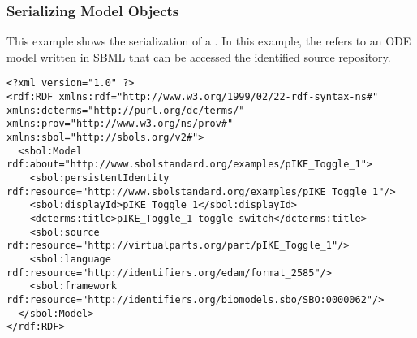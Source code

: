 \subsubsection{Serializing Model Objects}
This example shows the serialization of a . In this example, the  refers to an ODE model written in SBML that can be accessed the identified source repository.
\begin{lstlisting}
<?xml version="1.0" ?>
<rdf:RDF xmlns:rdf="http://www.w3.org/1999/02/22-rdf-syntax-ns#" xmlns:dcterms="http://purl.org/dc/terms/" xmlns:prov="http://www.w3.org/ns/prov#" xmlns:sbol="http://sbols.org/v2#">
  <sbol:Model rdf:about="http://www.sbolstandard.org/examples/pIKE_Toggle_1">
    <sbol:persistentIdentity rdf:resource="http://www.sbolstandard.org/examples/pIKE_Toggle_1"/>
    <sbol:displayId>pIKE_Toggle_1</sbol:displayId>
    <dcterms:title>pIKE_Toggle_1 toggle switch</dcterms:title>
    <sbol:source rdf:resource="http://virtualparts.org/part/pIKE_Toggle_1"/>
    <sbol:language rdf:resource="http://identifiers.org/edam/format_2585"/>
    <sbol:framework rdf:resource="http://identifiers.org/biomodels.sbo/SBO:0000062"/>
  </sbol:Model>
</rdf:RDF>
\end{lstlisting}

